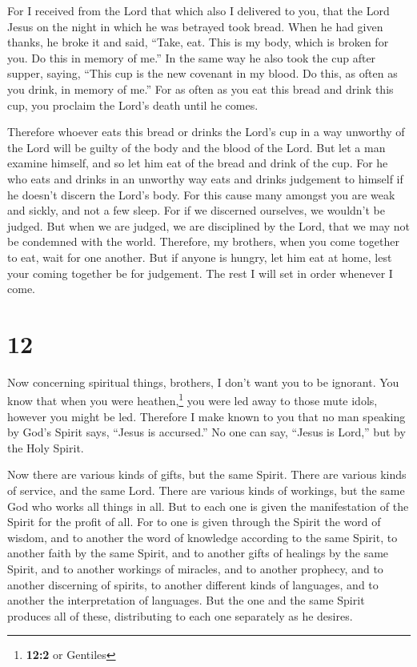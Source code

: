  For I received from the Lord that which also I delivered
to you, that the Lord Jesus on the night in which he was betrayed took
bread.  When he had given thanks, he broke it and said,
``Take, eat. This is my body, which is broken for you. Do this in memory
of me.''  In the same way he also took the cup after
supper, saying, ``This cup is the new covenant in my blood. Do this, as
often as you drink, in memory of me.''  For as often as
you eat this bread and drink this cup, you proclaim the Lord's death
until he comes.

 Therefore whoever eats this bread or drinks the Lord's
cup in a way unworthy of the Lord will be guilty of the body and the
blood of the Lord.  But let a man examine himself, and so
let him eat of the bread and drink of the cup.  For he
who eats and drinks in an unworthy way eats and drinks judgement to
himself if he doesn't discern the Lord's body.  For this
cause many amongst you are weak and sickly, and not a few sleep.
 For if we discerned ourselves, we wouldn't be judged.
 But when we are judged, we are disciplined by the Lord,
that we may not be condemned with the world.  Therefore,
my brothers, when you come together to eat, wait for one another.
 But if anyone is hungry, let him eat at home, lest your
coming together be for judgement. The rest I will set in order whenever
I come.

\hypertarget{section-11}{%
\section{12}\label{section-11}}

 Now concerning spiritual things, brothers, I don't want
you to be ignorant.  You know that when you were
heathen,\footnote{\textbf{12:2} or Gentiles} you were led away to those
mute idols, however you might be led.  Therefore I make
known to you that no man speaking by God's Spirit says, ``Jesus is
accursed.'' No one can say, ``Jesus is Lord,'' but by the Holy Spirit.

 Now there are various kinds of gifts, but the same
Spirit.  There are various kinds of service, and the same
Lord.  There are various kinds of workings, but the same
God who works all things in all.  But to each one is given
the manifestation of the Spirit for the profit of all. 
For to one is given through the Spirit the word of wisdom, and to
another the word of knowledge according to the same Spirit,
 to another faith by the same Spirit, and to another gifts
of healings by the same Spirit,  and to another workings
of miracles, and to another prophecy, and to another discerning of
spirits, to another different kinds of languages, and to another the
interpretation of languages.  But the one and the same
Spirit produces all of these, distributing to each one separately as he
desires.

